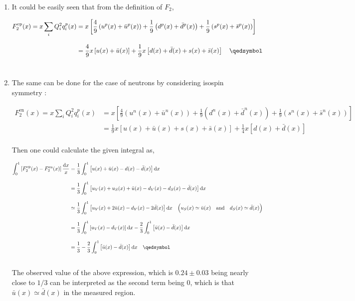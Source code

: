 \begin{solution}
    \begin{enumerate}[label=(\alph*)]
        \item It could be easily seen that from the definition of $F_2$,
            
            \begin{align*}
                F_2^\text{ep}(x) = x \sum_i Q_i^2 q_i^p(x) &= x \left[ \frac{4}{9} \left( u^p(x) + \bar{u}^p(x) \right) + \frac{1}{9} \left( d^p(x) + \bar{d}^p(x) \right) + \frac{1}{9} \left( s^p(x) + \bar{s}^p(x) \right) \right] \\[0.12in]
                &=  \frac{4}{9} x \left[ u(x) + \bar{u}(x) \right] + \frac{1}{9} x \left[ d(x) + \bar{d}(x) + s(x) + \bar{s}(x) \right] \qed
            \end{align*}\\
        \item The same can be done for the case of neutrons by considering isospin symmetry : 
        
            \begin{align*}
                F_2^\text{en}(x) = x \sum_i Q_i^2 q_i^p(x) &= x \left[ \frac{4}{9} \left( u^n(x) + \bar{u}^n(x) \right) + \frac{1}{9} \left( d^n(x) + \bar{d}^n(x) \right) + \frac{1}{9} \left( s^n(x) + \bar{s}^n(x) \right) \right] \\[0.12in]
                &=  \frac{1}{9} x \left[ u(x) + \bar{u}(x) + s(x) + \bar{s}(x)  \right] + \frac{1}{4} x \left[ d(x) + \bar{d}(x) \right]
            \end{align*}\\
            Then one could calculate the given integral as, 

            \begin{align*}
                \int_0^1 \left[  F_2^\text{ep}(x) - F_2^\text{en}(x) \right] \frac{\dif x}{x} &= \frac{1}{3} \int_0^1 \left[ u(x) + \bar{u}(x) - d(x) -\bar{d}(x) \right] \dif x \\[0.12in]
                &= \frac{1}{3} \int_0^1 \left[ u_V(x) + u_S(x) + \bar{u}(x) - d_V(x) - d_S(x) -\bar{d}(x) \right] \dif x \\[0.12in]
                &\simeq \frac{1}{3} \int_0^1 \left[ u_V(x) +2 \bar{u}(x) - d_V(x) - 2 \bar{d}(x) \right] \dif x \quad  \Big( u_S(x) 
                \simeq \bar{u}(x) \andtxt d_S(x) \simeq \bar{d}(x) \Big) \\[0.12in] 
                &= \frac{1}{3} \int_0^1 \left[ u_V(x)- d_V(x) \right] \dif x - \frac{2}{3} \int_0^1 \left[ \bar{u}(x) -\bar{d}(x) \right] \dif x \\[0.12in]
                &=  \frac{1}{3} - \frac{2}{3} \int_0^1 \left[ \bar{u}(x) -\bar{d}(x) \right] \dif x \qed
            \end{align*}\\
            The observed value of the above expression, which is $0.24\pm0.03$ being nearly close to $1/3$ can be interpreted as the second term being 0, which is that $\bar{u}(x)\simeq \bar{d}(x)$ in the measured region. 
    \end{enumerate}
\end{solution}

